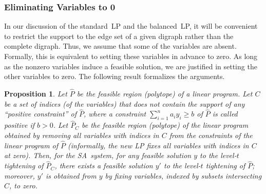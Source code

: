 \documentclass[11pt]{article}
\newtheorem{proposition}[theorem]{Proposition}
\newcommand{\iSA}{\textsf{SA}}
\newcommand\by {{y}}
\begin{document}
\subsubsection{Eliminating Variables to 0}\label{sec:EVto0}

In our discussion of the standard~LP and the balanced~LP,
it will be convenient to restrict
the support to the edge set of a given digraph
rather than the complete digraph.
Thus, we assume that some of the variables are absent.
Formally, this is equivalent to setting
these variables in advance to zero.
As long as the nonzero variables induce a feasible solution, we are
justified in setting the other variables to zero.
The following result formalizes the arguments.

\begin{proposition}
Let $\widehat{P}$ be the feasible region (polytope) of a linear program.
Let $C$ be a set of indices (of the variables) that does not contain
the support of any ``positive constraint'' of $\widehat{P}$, where a
constraint $\sum_{i=1}^n a_i y_i\geq{b}$ of $\widehat{P}$ is called
positive if $b>0$.
Let $\widehat{P}_C$ be the feasible region (polytope) of the linear
program obtained by removing all variables with indices in $C$ from the
constraints of the linear program of $\widehat{P}$ (informally, the
new LP fixes all variables with indices in $C$ at zero).
Then, for the \iSA\ system,
for any feasible solution $\by$ to the level-$t$ tightening of
$\widehat{P}_C$, there exists a feasible solution $\by'$ to the
level-$t$ tightening of $\widehat{P}$; moreover, $\by'$ is obtained from
$\by$ by fixing variables,
indexed by subsets intersecting $C$, to zero.
\end{proposition}
\end{document}
